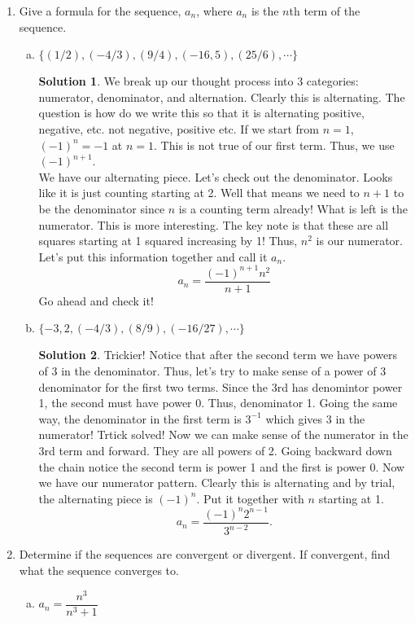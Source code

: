 \documentclass[10pt]{article}
\theoremstyle{Theorem}
\theoremstyle{definition}
\newtheorem*{solution}{Solution}
\theoremstyle{remark}
\theoremstyle{custom}
\begin{document}
\begin{enumerate}[1.]
\item Give a formula for the sequence, $a_n$, where $a_n$ is the $n$th term of the sequence.
\begin{enumerate}[a.]
\item $\{(1/2), (-4/3), (9/4), (-16,5), (25/6),\cdots \}$
\begin{solution}
We break up our thought process into 3 categories: numerator, denominator, and alternation.
Clearly this is alternating. The question is how do we write this so that it is alternating positive, negative, etc. not negative, positive etc. If we start from $n=1$, $(-1)^n=-1$ at $n=1$. This is not true of our first term. Thus, we use $(-1)^{n+1}$.\\
We have our alternating piece. Let's check out the denominator.  Looks like it is just counting starting at 2. Well that means we need to $n+1$ to be the denominator since $n$ is a counting term already! What is left is the numerator. This is more interesting. The key note is that these are all squares starting at 1 squared increasing by 1! Thus, $n^2$ is our numerator. Let's put this information together and call it $a_n$.
\[a_n=\dfrac{(-1)^{n+1}n^2}{n+1}
\]
Go ahead and check it!
\end{solution}
\item $\{-3, 2, (-4/3), (8/9), (-16/27), \cdots \}$
\begin{solution}
Trickier! Notice that after the second term we have powers of 3 in the denominator. Thus, let's try to make sense of a power of 3 denominator for the first two terms. Since the 3rd has denomintor power 1, the second must have power 0. Thus, denominator 1. Going the same way, the denominator in the first term is $3^{-1}$ which gives 3 in the numerator! Trtick solved! Now we can make sense of the numerator in the 3rd term and forward. They are all powers of 2. Going backward down the chain notice the second term is power 1 and the first is power 0. Now we have our numerator pattern. Clearly this is alternating and by trial, the alternating piece is $(-1)^n$. Put it together with $n$ starting at 1.
\[
a_n=\dfrac{(-1)^n2^{n-1}}{3^{n-2}}.
\]
\end{solution}
\end{enumerate}
\item Determine if the sequences are convergent or divergent. If convergent, find what the sequence converges to.
\begin{enumerate}[a.]
\item $a_n=\dfrac{n^3}{n^3+1}$


\end{enumerate}
\end{enumerate}
\end{document}
